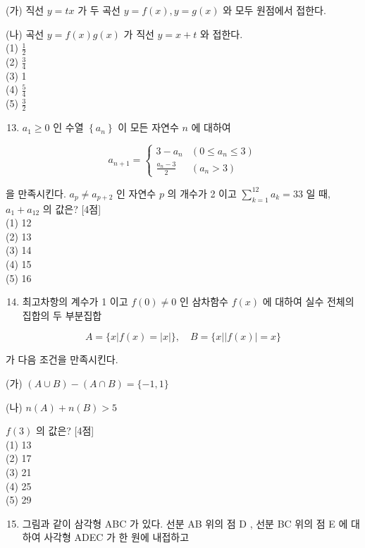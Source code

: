 \documentclass[10pt]{article}
\begin{document}
(가) 직선 $y=t x$ 가 두 곡선 $y=f(x), y=g(x)$ 와 모두 원점에서 접한다.

(나) 곡선 $y=f(x) g(x)$ 가 직선 $y=x+t$ 와 접한다.\\
(1) $\frac{1}{2}$\\
(2) $\frac{3}{4}$\\
(3) 1\\
(4) $\frac{5}{4}$\\
(5) $\frac{3}{2}$

\begin{enumerate}
  \setcounter{enumi}{12}
  \item $a_{1} \geq 0$ 인 수열 $\left\{a_{n}\right\}$ 이 모든 자연수 $n$ 에 대하여
\end{enumerate}

\[
a_{n+1}= \begin{cases}3-a_{n} & \left(0 \leq a_{n} \leq 3\right) \\ \frac{a_{n}-3}{2} & \left(a_{n}>3\right)\end{cases}
\]

을 만족시킨다. $a_{p} \neq a_{p+2}$ 인 자연수 $p$ 의 개수가 2 이고 $\sum_{k=1}^{12} a_{k}=33$ 일 때, $a_{1}+a_{12}$ 의 값은? [4점]\\
(1) 12\\
(2) 13\\
(3) 14\\
(4) 15\\
(5) 16

\begin{enumerate}
  \setcounter{enumi}{13}
  \item 최고차항의 계수가 1 이고 $f(0) \neq 0$ 인 삼차함수 $f(x)$ 에 대하여 실수 전체의 집합의 두 부분집합
\end{enumerate}

\[
A=\{x|f(x)=| x \mid\}, \quad B=\{x|| f(x) \mid=x\}
\]

가 다음 조건을 만족시킨다.

(가) $(A \cup B)-(A \cap B)=\{-1,1\}$

(나) $n(A)+n(B)>5$

$f(3)$ 의 값은? [4점]\\
(1) 13\\
(2) 17\\
(3) 21\\
(4) 25\\
(5) 29

\begin{enumerate}
  \setcounter{enumi}{14}
  \item 그림과 같이 삼각형 ABC 가 있다. 선분 AB 위의 점 D , 선분 BC 위의 점 E 에 대하여 사각형 ADEC 가 한 원에 내접하고
\end{enumerate}
\end{document}
